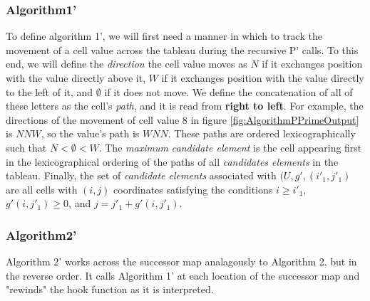\documentclass[11pt]{article}
\theoremstyle{definition}
\begin{document}
\subsubsection{Algorithm1'}
To define algorithm 1', we will first need a manner in which to track the movement of a cell value across the tableau during the recursive P' calls. To this end, we will define the \emph{direction} the cell value moves as $N$ if it exchanges position with the value directly above it, $W$ if it exchanges position with the value directly to the left of it, and $\emptyset$ if it does not move. We define the concatenation of all of these letters as the cell's \emph{path}, and it is read from \textbf{right to left}.  
For example, the directions of the movement of cell value 8 in figure \ref{fig:AlgorithmPPrimeOutput} is $N N W$, so the value's path is $W N N$. These paths are ordered lexicographically such that $N < \emptyset < W$. The \emph{maximum candidate element} is the cell appearing first in the lexicographical ordering of the paths of all \emph{candidates elements} in the tableau. 
Finally, the set of \emph{candidate elements} associated with $(U,g',(i'_1,j'_1)$ are all cells with $(i,j)$ coordinates satisfying the conditions $i \geq i'_1$, $g'(i,j'_1) \ge 0$, and $j = j'_1 + g'(i,j'_1)$.
\begin{algorithm}[H]
\end{algorithm}
\subsubsection{Algorithm2'}
Algorithm 2' works across the successor map analagously to Algorithm 2, but in the reverse order. It calls Algorithm 1' at each location of the successor map and "rewinds" the hook function as it is interpreted. 

\begin{algorithm}[H]
\end{algorithm}
\end{document}
